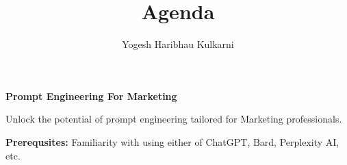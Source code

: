 \documentclass[a4paper, 11pt]{article}
\title{Agenda}
\author{Yogesh Haribhau Kulkarni}
\begin{document}
\pagestyle{mystyle}

\makebox[\linewidth]{}
\begin{center} 
\textbf{\Large Prompt Engineering For Marketing}
\end{center}
\makebox[\linewidth]{}


Unlock the potential of prompt engineering tailored for Marketing professionals.

\makebox[\linewidth]{}
\textbf{Prerequsites:} Familiarity with using either of ChatGPT, Bard, Perplexity AI, etc.
%
\makebox[\linewidth]{}\\
\end{document}
